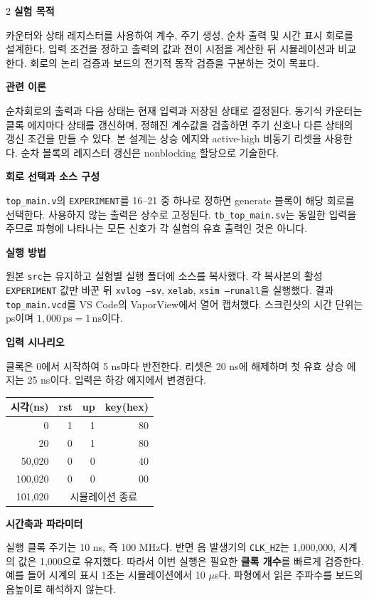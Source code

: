 \documentclass[a4paper,10pt]{article}
\begin{document}
\begin{multicols}{2}
\textbf{실험 목적}\par
카운터와 상태 레지스터를 사용하여 계수, 주기 생성, 순차 출력 및 시간 표시 회로를 설계한다.
입력 조건을 정하고 출력의 값과 전이 시점을 계산한 뒤 시뮬레이션과 비교한다.
회로의 논리 검증과 보드의 전기적 동작 검증을 구분하는 것이 목표다.

\textbf{관련 이론}\par
순차회로의 출력과 다음 상태는 현재 입력과 저장된 상태로 결정된다.
동기식 카운터는 클록 에지마다 상태를 갱신하며, 정해진 계수값을 검출하면
주기 신호나 다른 상태의 갱신 조건을 만들 수 있다\cite{mano}.
본 설계는 상승 에지와 active-high 비동기 리셋을 사용한다.
순차 블록의 레지스터 갱신은 nonblocking 할당으로 기술한다.

\textbf{회로 선택과 소스 구성}\par
\texttt{top\_main.v}의 \texttt{EXPERIMENT}를 16--21 중 하나로 정하면
generate 블록이 해당 회로를 선택한다. 사용하지 않는 출력은 상수로 고정된다.
\texttt{tb\_top\_main.sv}는 동일한 입력을 주므로 파형에 나타나는 모든 신호가
각 실험의 유효 출력인 것은 아니다.

\textbf{실행 방법}\par
원본 \texttt{src}는 유지하고 실험별 실행 폴더에 소스를 복사했다.
각 복사본의 활성 \texttt{EXPERIMENT} 값만 바꾼 뒤
\texttt{xvlog --sv}, \texttt{xelab}, \texttt{xsim --runall}을 실행했다.
결과 \texttt{top\_main.vcd}를 VS Code의 VaporView에서 열어 캡처했다.
스크린샷의 시간 단위는 ps이며 $1{,}000\,\mathrm{ps}=1\,\mathrm{ns}$이다.
\par\columnbreak\noindent
\textbf{입력 시나리오}\par
클록은 0에서 시작하여 5 ns마다 반전한다. 리셋은 20 ns에 해제하며
첫 유효 상승 에지는 25 ns이다. 입력은 하강 에지에서 변경한다.
\begin{center}\small
\begin{tabular}{rrrr}\toprule
시각(ns) & rst & up & key(hex)\\\midrule
0 & 1 & 1 & 80\\
20 & 0 & 1 & 80\\
50,020 & 0 & 0 & 40\\
100,020 & 0 & 0 & 00\\
101,020 & \multicolumn{3}{c}{시뮬레이션 종료}\\\bottomrule
\end{tabular}\end{center}

\textbf{시간축과 파라미터}\par
실행 클록 주기는 10 ns, 즉 100 MHz다.
반면 음 발생기의 \texttt{CLK\_HZ}는 1,000,000,
시계의 값은 1,000으로 유지했다.
따라서 이번 실행은 필요한 \textbf{클록 개수}를 빠르게 검증한다.
예를 들어 시계의 표시 1초는 시뮬레이션에서 10 $\mu$s다.
파형에서 읽은 주파수를 보드의 음높이로 해석하지 않는다.


\end{multicols}
\end{document}
